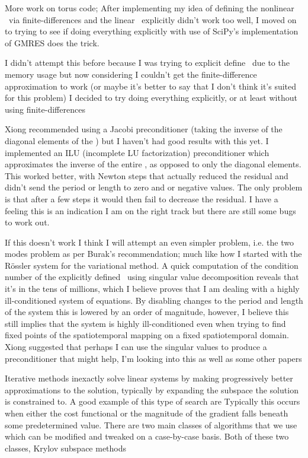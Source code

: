 More work on torus code; After implementing my idea of defining
the nonlinear \jacobianM\ via finite-differences and the linear \jacobianM\
explicitly didn't work too well, I moved on to trying to see if doing everything
explicitly with use of SciPy's implementation of GMRES does the trick.

I didn't attempt this before because I was trying to explicit define \jacobianMs\
due to the memory usage but now considering I couldn't get the finite-difference
approximation to work (or maybe it's better to say that I don't think it's suited
for this problem) I decided to try doing everything explicitly, or at least
without using finite-differences

Xiong recommended using a Jacobi preconditioner (taking the inverse of the diagonal
elements of the \jacobianM) but I haven't had good results with this yet. I implemented
an ILU (incomplete LU factorization) preconditioner which approximates the inverse
of the entire \jacobianM, as opposed to only the diagonal elements. This worked better,
with Newton steps that actually reduced the residual and didn't send the period or length
to zero and or negative values. The only problem is that after a few
steps it would then fail to decrease the residual.
 I have a feeling this is an indication I am on the right
track but there are still some bugs to work out.



If this doesn't work I think I will attempt an even simpler problem, i.e.
the two modes problem as per Burak's recommendation; much like how I started
with the R\"ossler system for the variational method.
A quick computation of the condition number of the explicitly defined \jacobianM\ using
singular value decomposition reveals that it's in the tens of millions, which I believe
proves that I am dealing with a highly ill-conditioned system of equations.
By disabling changes to the period and length of the system this is lowered by an
order of magnitude, however, I believe this still implies that the system is highly ill-conditioned
even when trying to find fixed points of the spatiotemporal mapping on a fixed spatiotemporal domain.
Xiong suggested that perhaps I can use the singular values to produce a preconditioner that might help,
I'm looking into this as well as some other papers\rf{Meza95}


Iterative
methods inexactly solve linear systems by making progressively
better approximations to the solution, typically by expanding
the subspace the solution is constrained to. A good example
of this type of search are
Typically this occurs when either the cost
functional or the magnitude of the gradient falls beneath some
predetermined value. There are two main classes of algorithms that we use
which can be modified and tweaked on a case-by-case basis. Both of these
two classes, Krylov subspace methods

